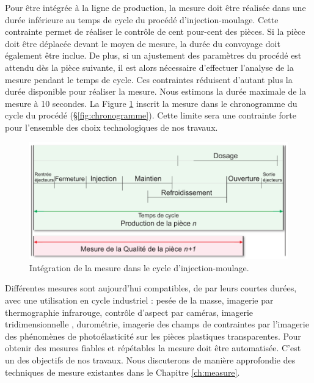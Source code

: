 Pour être intégrée à la ligne de production, la mesure doit être réalisée dans une durée inférieure au temps de cycle du procédé d'injection-moulage.
Cette contrainte permet de réaliser le contrôle de cent pour-cent des pièces.
Si la pièce doit être déplacée devant le moyen de mesure, la durée du convoyage doit également être inclue.
De plus, si un ajustement des paramètres du procédé est attendu dès la pièce suivante, il est alors nécessaire d'effectuer l'analyse de la mesure pendant le temps de cycle.
Ces contraintes réduisent d'autant plus la durée disponible pour réaliser la mesure.
Nous estimons la durée maximale de la mesure à 10 secondes.
La Figure \ref{fig:time_constraint} inscrit la mesure dans le chronogramme du cycle du procédé (§\ref{fig:chronogramme}).
Cette limite sera une contrainte forte pour l'ensemble des choix technologiques de nos travaux.

\begin{figure}[hbtp]
	\centering
	\includegraphics[width=\textwidth,height=\textheight,keepaspectratio]{../Chap1/Figures/SAPRISTI_Chronogramme-Simple.pdf}
	\caption{Intégration de la mesure dans le cycle d'injection-moulage.}
	\label{fig:time_constraint}
\end{figure}

Différentes mesures sont aujourd'hui compatibles, de par leurs courtes durées, avec une utilisation en cycle industriel : pesée de la masse, imagerie par thermographie infrarouge, contrôle d'aspect par caméras, imagerie tridimensionnelle \cite{schwenke_optical_2002}, durométrie, imagerie des champs de contraintes par l'imagerie des phénomènes de photoélasticité sur les pièces plastiques transparentes.
Pour obtenir des mesures fiables et répétables la mesure doit être automatisée.
C'est un des objectifs de nos travaux.
Nous discuterons de manière approfondie des techniques de mesure existantes dans le Chapitre \ref{ch:measure}.

